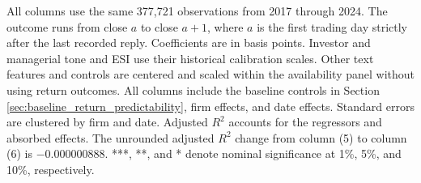 \begin{table}[H]
\begin{threeparttable}
\begin{tablenoteblock}
All columns use the same 377,721 observations from 2017 through 2024. The outcome runs from close $a$ to close $a+1$, where $a$ is the first trading day strictly after the last recorded reply. Coefficients are in basis points. Investor and managerial tone and ESI use their historical calibration scales. Other text features and controls are centered and scaled within the availability panel without using return outcomes. All columns include the baseline controls in Section \ref{sec:baseline_return_predictability}, firm effects, and date effects. Standard errors are clustered by firm and date. Adjusted $R^2$ accounts for the regressors and absorbed effects. The unrounded adjusted $R^2$ change from column (5) to column (6) is $-0.000000888$. ***, **, and * denote nominal significance at 1\%, 5\%, and 10\%, respectively.
\end{tablenoteblock}
\end{threeparttable}
\end{table}
\clearpage
